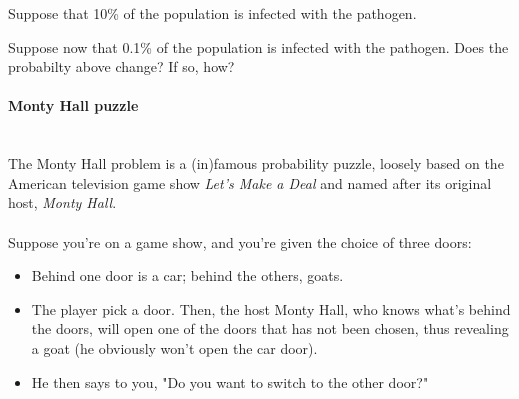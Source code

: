 \documentclass[a4paper,11pt]{exam}
\newcounter{ct}
\newcommand{\myparagraph}[1]{\paragraph{#1}\mbox{}\\}
\begin{document}
\begin{questions}
	\question Suppose that 10\% of the population is infected with the pathogen.
	\question Suppose now that 0.1\% of the population is infected with the pathogen. Does the probabilty above change? If so, how?
\end{questions}

\myparagraph{Monty Hall puzzle} The Monty Hall problem is a (in)famous probability puzzle, loosely based on the American television game show \textit{Let's Make a Deal} and named after its original host, \textit{Monty Hall}.
\\\\
Suppose you're on a game show, and you're given the choice of three doors:
\begin{tcolorbox}[colback=white]
	\begin{itemize}
		\item Behind one door is a car; behind the others, goats.
		\item The player pick a door. Then, the host Monty Hall, who knows what's behind the doors, will open one of the doors that has not been chosen, thus revealing a goat (he obviously won't open the car door).
		\item He then says to you, "Do you want to switch to the other door?"
	\end{itemize}
\end{tcolorbox}
\begin{questions}
\end{questions}
\end{document}
